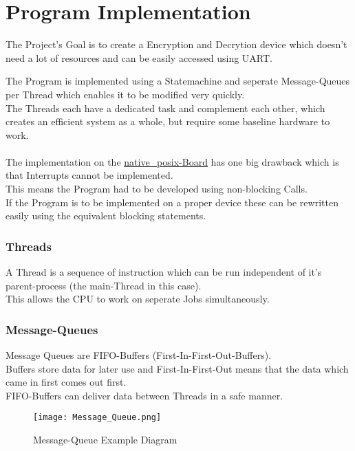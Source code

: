 \pagebreak

\section{Program Implementation}

The Project's Goal is to create a Encryption and Decrytion device which
doesn't need a lot of resources and can be easily accessed using UART.

The Program is implemented using a Statemachine and seperate Message-Queues
per Thread which enables it to be modified very quickly.
\\
The Threads each have a dedicated task and complement each other, which creates
an efficient system as a whole, but require some baseline hardware to work.
\\
\\
The implementation on the
\href{https://docs.zephyrproject.org/2.0.0/boards/posix/native_posix/doc/index.html?highlight=native_posix}
{native\_posix-Board} has one big drawback which is that Interrupts cannot be
implemented.
\\
This means the Program had to be developed using non-blocking Calls.
\\
If the Program is to be implemented on a proper device these can be rewritten easily
using the equivalent blocking statements.

\subsubsection{Threads}

A Thread is a sequence of instruction which can be run
independent of it's parent-process (the main-Thread in this case).
\\
This allows the CPU to work on seperate Jobs simultaneously.

\subsubsection{Message-Queues}

Message Queues are FIFO-Buffers (First-In-First-Out-Buffers).
\\
Buffers store data for later use and First-In-First-Out means
that the data which came in first comes out first.
\\
FIFO-Buffers can deliver data between Threads in a safe manner.

\begin{figure}[!ht]
	\begin{center}
		\texttt{[image: Message\_Queue.png]}
		\caption{Message-Queue Example Diagram}
	\end{center}
\end{figure}

